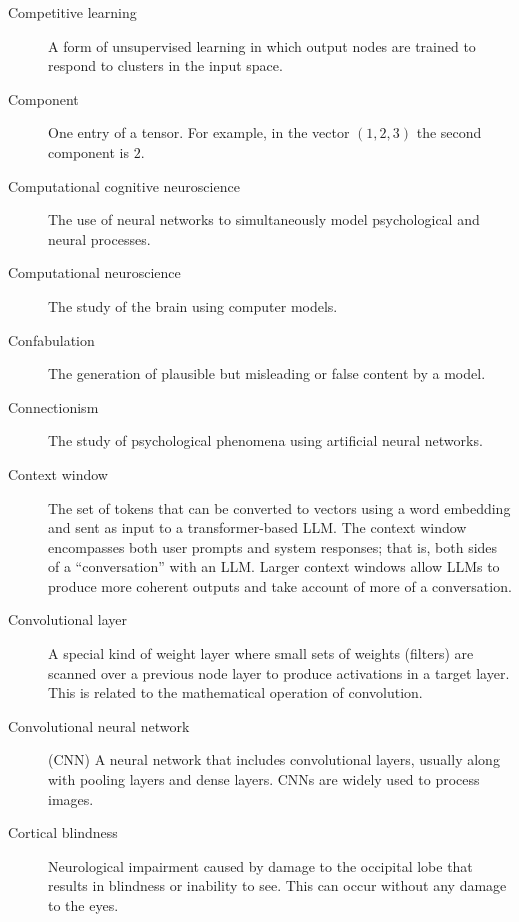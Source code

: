 \begin{description}
\item[Competitive learning] A form of unsupervised learning in which output nodes are trained to respond to clusters in the input space.

\item[Component] One entry of a tensor. For example, in the vector $(1,2,3)$ the second component is $2$.

\item[Computational cognitive neuroscience] The use of neural networks to simultaneously model psychological and neural processes.

\item[Computational neuroscience] The study of the brain using computer models.

\item[Confabulation] The generation of plausible but misleading or false content by a model.

\item[Connectionism] The study of psychological phenomena using artificial neural networks.

\item[Context window] The set of tokens that can be converted to vectors using a word embedding and sent as input to a transformer-based LLM.  The context window encompasses both user prompts and system responses; that is, both sides of a ``conversation'' with an LLM. Larger context windows allow LLMs to produce more coherent outputs and take account of more of a conversation.


\item[Convolutional layer] A special kind of weight layer where small sets of weights (filters) are scanned over a previous node layer to produce activations in a target layer. This is related to the mathematical operation of convolution.

\item[Convolutional neural network] (CNN) A neural network that includes convolutional layers, usually along with pooling layers and dense layers. CNNs are widely used to process images.

\item[Cortical blindness] Neurological impairment caused by damage to the occipital lobe that results in blindness or inability to see. This can occur without any damage to the eyes.


\end{description}

